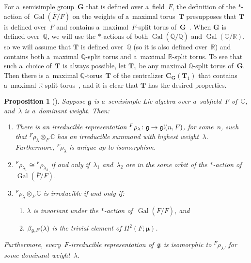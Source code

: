 \documentclass[11pt]{article}
\DeclareMathOperator{\Gal}{Gal}
\numberwithin{equation}{section}
\newtheorem{prop}{Proposition}[section]
\newcommand{\Lie}[1]{\mathfrak{\lowercase{#1}}}
\begin{document}
\begin{rem}
For a~semisimple group~$\mathbf{G}$ that is def\/ined over a~f\/ield~$F$, the def\/inition of the $*$-action of
$\Gal(\overline{F}/F)$ on the weights of a~maximal torus~$\mathbf{T}$ presupposes that $\mathbf{T}$ is def\/ined over~$F$
and contains a~maximal~$F$-split torus of~$\mathbf{G}$~\cite[p.~66]{PlatonovRapinchukBook}.
When $\mathbf{G}$ is def\/ined over~$\mathbb{Q}$, we will use the $*$-actions of both $\Gal(\overline{\mathbb{Q}}/\mathbb{Q})$ and $\Gal(\mathbb{C}/\mathbb{R})$, so we will assume that $\mathbf{T}$ is def\/ined
over~$\mathbb{Q}$ (so it is also def\/ined over~$\mathbb{R}$) and contains both a~maximal $\mathbb{Q}$-split torus and
a~maximal $\mathbb{R}$-split torus.
To see that such a~choice of~$\mathbf{T}$ is always possible, let $\mathbf{T}_1$ be any maximal $\mathbb{Q}$-split torus
of~$\mathbf{G}$.
Then there is a~maximal $\mathbb{Q}$-torus~$\mathbf{T}$ of the centralizer $\mathbf{C}_{\mathbf{G}}(\mathbf{T}_1)$ that
contains a~maximal $\mathbb{R}$-split torus~\cite[Corollary~2 of Proposition~7.8, p.~418]{PlatonovRapinchukBook}, and it is clear
that $\mathbf{T}$ has the desired properties.
\end{rem}

\begin{prop}[]\label{HighWt}
Suppose $\Lie G$ is a~semisimple Lie algebra over a~subfield~$F$ of~$\mathbb{C}$, and~$\lambda$ is a~dominant weight.
Then:
\renewcommand{\labelenumi}{{\rm \theenumi.}}
\begin{enumerate}\itemsep=0pt
\item There is an irreducible representation ${}^F \rho_\lambda \colon \Lie G \to \Lie{GL}(n, F)$, for some~$n$, such
that \mbox{${}^F \rho_\lambda \otimes_F \mathbb{C}$} has an irreducible summand with highest weight~$\lambda$.
Furthermore, ${}^F \rho_\lambda$ is unique up to isomorphism.

\item ${}^F \rho_{\lambda_1} \cong {}^F \rho_{\lambda_2}$ if and only if~$\lambda_1$ and~$\lambda_2$ are in the same
orbit of the $*$-action of~$\Gal(\overline{F}/F)$.

\item
\label{HighWt-IrredIff}
${}^F \rho_\lambda \otimes_F \mathbb{C}$ is irreducible if and only if:
\begin{enumerate}[{\rm (a)}]\itemsep=0pt
\item
$\lambda$ is invariant under the $*$-action of~$\Gal(\overline{F}/F)$, and
\item
$\beta_{\Lie G,F}(\lambda)$ is the trivial element of $H^2(F; \boldsymbol\mu)$.
\end{enumerate}
\end{enumerate}
Furthermore, every~$F$-irreducible representation of~$\Lie G$ is isomorphic to ${}^F \rho_{\lambda}$, for some
dominant weight~$\lambda$.
\end{prop}
\end{document}

